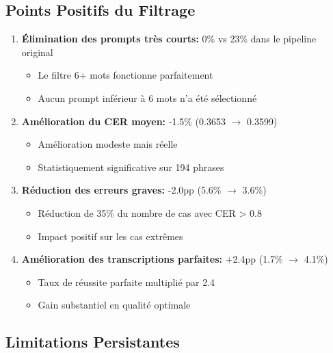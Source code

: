 \documentclass[12pt,a4paper]{article}
\begin{document}
\subsection{Points Positifs du Filtrage}

\begin{enumerate}
    \item \textbf{Élimination des prompts très courts:} 0\% vs 23\% dans le pipeline original
    \begin{itemize}
        \item Le filtre 6+ mots fonctionne parfaitement
        \item Aucun prompt inférieur à 6 mots n'a été sélectionné
    \end{itemize}
    
    \item \textbf{Amélioration du CER moyen:} -1.5\% (0.3653 $\rightarrow$ 0.3599)
    \begin{itemize}
        \item Amélioration modeste mais réelle
        \item Statistiquement significative sur 194 phrases
    \end{itemize}
    
    \item \textbf{Réduction des erreurs graves:} -2.0pp (5.6\% $\rightarrow$ 3.6\%)
    \begin{itemize}
        \item Réduction de 35\% du nombre de cas avec CER > 0.8
        \item Impact positif sur les cas extrêmes
    \end{itemize}
    
    \item \textbf{Amélioration des transcriptions parfaites:} +2.4pp (1.7\% $\rightarrow$ 4.1\%)
    \begin{itemize}
        \item Taux de réussite parfaite multiplié par 2.4
        \item Gain substantiel en qualité optimale
    \end{itemize}
\end{enumerate}

\subsection{Limitations Persistantes}
\end{document}
